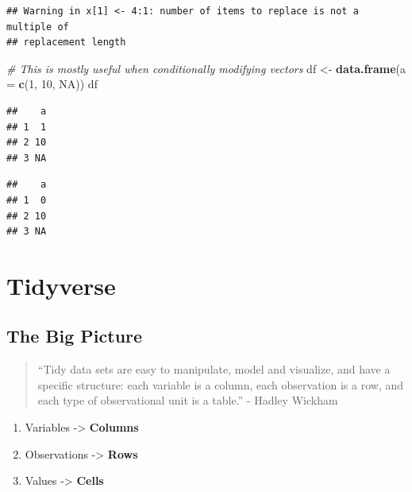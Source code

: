 \documentclass[
]{book}
\newenvironment{Shaded}{\begin{snugshade}}{\end{snugshade}}
\newcommand{\AttributeTok}[1]{\textcolor[rgb]{0.13,0.29,0.53}{#1}}
\newcommand{\CommentTok}[1]{\textcolor[rgb]{0.56,0.35,0.01}{\textit{#1}}}
\newcommand{\ConstantTok}[1]{\textcolor[rgb]{0.56,0.35,0.01}{#1}}
\newcommand{\DecValTok}[1]{\textcolor[rgb]{0.00,0.00,0.81}{#1}}
\newcommand{\FunctionTok}[1]{\textcolor[rgb]{0.13,0.29,0.53}{\textbf{#1}}}
\newcommand{\NormalTok}[1]{#1}
\newcommand{\OtherTok}[1]{\textcolor[rgb]{0.56,0.35,0.01}{#1}}
\newcommand{\SpecialCharTok}[1]{\textcolor[rgb]{0.81,0.36,0.00}{\textbf{#1}}}
\providecommand{\tightlist}{%
  \setlength{\itemsep}{0pt}\setlength{\parskip}{0pt}}
\begin{document}
\begin{verbatim}
## Warning in x[1] <- 4:1: number of items to replace is not a multiple of
## replacement length
\end{verbatim}

\begin{Shaded}
\begin{Highlighting}[]
\CommentTok{\# This is mostly useful when conditionally modifying vectors}
\NormalTok{df }\OtherTok{\textless{}{-}} \FunctionTok{data.frame}\NormalTok{(}\AttributeTok{a =} \FunctionTok{c}\NormalTok{(}\DecValTok{1}\NormalTok{, }\DecValTok{10}\NormalTok{, }\ConstantTok{NA}\NormalTok{))}
\NormalTok{df}
\end{Highlighting}
\end{Shaded}

\begin{verbatim}
##    a
## 1  1
## 2 10
## 3 NA
\end{verbatim}

\begin{Shaded}
\end{Shaded}

\begin{verbatim}
##    a
## 1  0
## 2 10
## 3 NA
\end{verbatim}

\section{Tidyverse}\label{tidyverse}

\subsection{The Big Picture}\label{the-big-picture-5}

\begin{quote}
``Tidy data sets are easy to manipulate, model and visualize, and have a specific structure: each variable is a column, each observation is a row, and each type of observational unit is a table.'' - Hadley Wickham
\end{quote}

\begin{enumerate}
\def\labelenumi{\arabic{enumi}.}
\tightlist
\item
  Variables -\textgreater{} \textbf{Columns}
\item
  Observations -\textgreater{} \textbf{Rows}
\item
  Values -\textgreater{} \textbf{Cells}
\end{enumerate}
\end{document}
